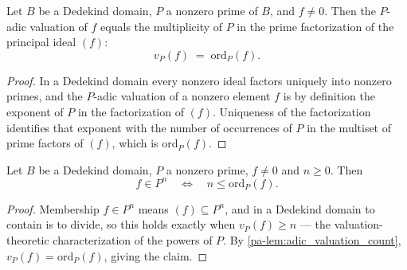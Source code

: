 \begin{lemma}
  \label{pa-lem:adic_valuation_count}
  \leanok

  Let \(B\) be a Dedekind domain, \(P\) a nonzero prime of \(B\), and \(f \neq 0\).
  Then the \(P\)-adic valuation of \(f\) equals the multiplicity of \(P\) in the prime
  factorization of the principal ideal \((f)\):
  \[
    v_P(f) \;=\; \mathrm{ord}_P(f) .
  \]
\end{lemma}
\begin{proof}
  \leanok
  In a Dedekind domain every nonzero ideal factors uniquely into nonzero primes, and
  the \(P\)-adic valuation of a nonzero element \(f\) is by definition the exponent of
  \(P\) in the factorization of \((f)\). Uniqueness of the factorization identifies
  that exponent with the number of occurrences of \(P\) in the multiset of prime
  factors of \((f)\), which is \(\mathrm{ord}_P(f)\).
\end{proof}

\begin{lemma}
  \label{pa-lem:mem_pow_iff_le_count}
  \leanok

  Let \(B\) be a Dedekind domain, \(P\) a nonzero prime, \(f \neq 0\) and \(n \ge 0\).
  Then
  \[
    f \in P^n \quad\Longleftrightarrow\quad n \le \mathrm{ord}_P(f) .
  \]
\end{lemma}
\begin{proof}
  \leanok
  Membership \(f \in P^n\) means \((f) \subseteq P^n\), and in a Dedekind domain to
  contain is to divide, so this holds exactly when \(v_P(f) \ge n\) --- the
  valuation-theoretic characterization of the powers of \(P\). By
  \ref{pa-lem:adic_valuation_count}, \(v_P(f) = \mathrm{ord}_P(f)\), giving the claim.
\end{proof}

